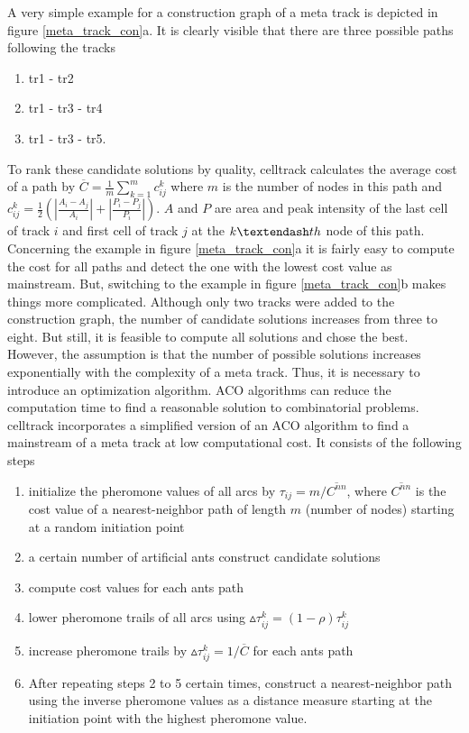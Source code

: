\documentclass{scrartcl}
\begin{document}
A very simple example for a construction graph of a meta track is depicted in figure \ref{meta_track_con}a. It is clearly visible that there are three possible paths following the tracks
\begin{enumerate}
	\item tr1 - tr2
	\item tr1 - tr3 - tr4	
	\item tr1 - tr3 - tr5.
\end{enumerate}
To rank these candidate solutions by quality, celltrack calculates the average cost of a path by $\overline{C}=\frac{1}{m}\sum_{k=1}^{m}{c_{ij}^k}$ where $m$ is the number of nodes in this path and $c_{ij}^k=\frac{1}{2}(|\frac{A_i-A_j}{A_i}| + |\frac{P_i-P_j}{P_i}|)$. $A$ and $P$ are area and peak intensity of the last cell of track $i$ and first cell of track $j$ at the $k\textendash th$ node of this path. Concerning the example in figure \ref{meta_track_con}a it is fairly easy to compute the cost for all paths and detect the one with the lowest cost value as mainstream. But, switching to the example in figure \ref{meta_track_con}b makes things more complicated. Although only two tracks were added to the construction graph, the number of candidate solutions increases from three to eight. But still, it is feasible to compute all solutions and chose the best. However, the assumption is that the number of possible solutions increases exponentially with the complexity of a meta track. Thus, it is necessary to introduce an optimization algorithm. ACO algorithms can reduce the computation time to find a reasonable solution to combinatorial problems. celltrack incorporates a simplified version of an ACO algorithm \citep{DorSta2004:book} to find a mainstream of a meta track at low computational cost. It consists of the following steps
\begin{enumerate}
	\item initialize the pheromone values of all arcs by $\tau_{ij}=m/\overline{C^{nn}}$, where $\overline{C^{nn}}$ is the cost value of a nearest-neighbor path of length $m$ (number of nodes) starting at a random initiation point
	\item a certain number of artificial ants construct candidate solutions
	\item compute cost values for each ants path
	\item lower pheromone trails of all arcs using $\vartriangle \tau_{ij}^{k}=(1-\rho)\tau_{ij}^{k}$
	\item increase pheromone trails by $\vartriangle \tau_{ij}^k=1/\overline{C}$ for each ants path
	\item After repeating steps 2 to 5 certain times, construct a nearest-neighbor path using the inverse pheromone values as a distance measure starting at the initiation point with the highest pheromone value.
\end{enumerate}
\end{document}
